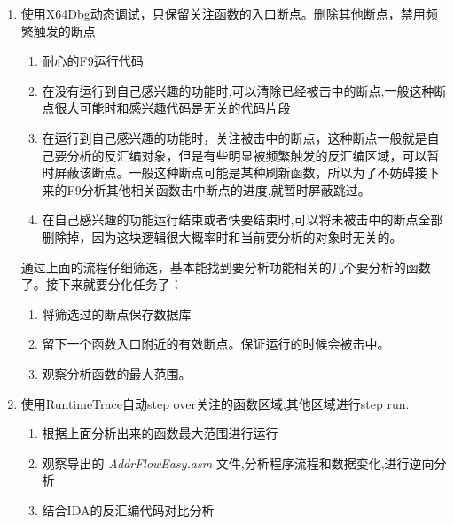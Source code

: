 \documentclass[AutoFakeBold,AutoFakeSlant]{article}
\begin{document}
\begin{flushleft}
\begin{enumerate}
			\item 使用X64Dbg动态调试，只保留关注函数的入口断点。删除其他断点，禁用频繁触发的断点
				{
					\small
					\begin{enumerate}
						\item 耐心的F9运行代码
						\item 在没有运行到自己感兴趣的功能时,可以清除已经被击中的断点,一般这种断点很大可能时和感兴趣代码是无关的代码片段
						\item 在运行到自己感兴趣的功能时，关注被击中的断点，这种断点一般就是自己要分析的反汇编对象，但是有些明显被频繁触发的反汇编区域，可以暂时屏蔽该断点。一般这种断点可能是某种刷新函数，所以为了不妨碍接下来的F9分析其他相关函数击中断点的进度,就暂时屏蔽跳过。
						\item 在自己感兴趣的功能运行结束或者快要结束时,可以将未被击中的断点全部删除掉，因为这块逻辑很大概率时和当前要分析的对象时无关的。
					\end{enumerate}
					通过上面的流程仔细筛选，基本能找到要分析功能相关的几个要分析的函数了。接下来就要分化任务了：
					\begin{enumerate}
						\item 将筛选过的断点保存数据库
						\item 留下一个函数入口附近的有效断点。保证运行的时候会被击中。
						\item 观察分析函数的最大范围。
					\end{enumerate}
				}
			\item 使用RuntimeTrace自动step over关注的函数区域,其他区域进行step run.
				{
					\small
					\begin{enumerate}
						\item 根据上面分析出来的函数最大范围进行运行
						\item 观察导出的 \textit{AddrFlowEasy.asm} 文件,分析程序流程和数据变化,进行逆向分析
						\item 结合IDA的反汇编代码对比分析
					\end{enumerate}
				}
		\end{enumerate}
		
	\end{flushleft}
		
\end{document}
